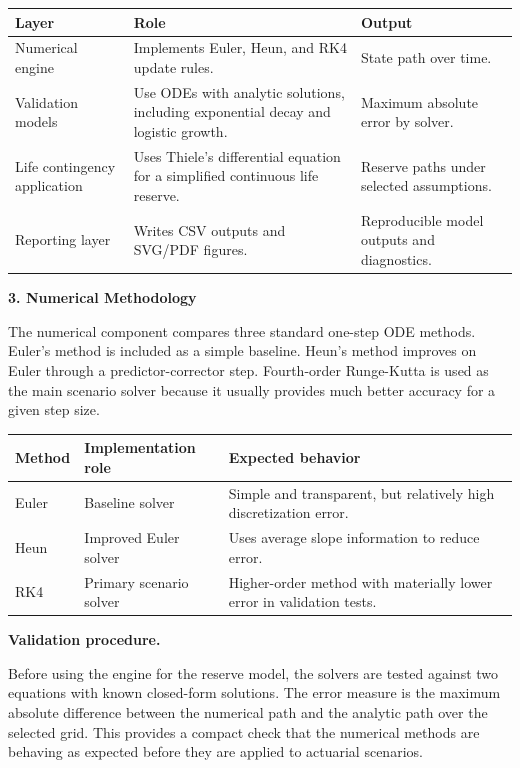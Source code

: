 \documentclass[11pt,letterpaper]{article}
\newcommand{\reportsection}[1]{%
  \vspace{5pt}
  \begin{center}
    {\large\bfseries #1}
  \end{center}
  \vspace{1pt}
}
\newcommand{\reportsubsection}[1]{%
  \vspace{5pt}
  {\normalsize\bfseries #1.}
}
\begin{document}
\begin{table}[H]
\centering
\small
{}
\begin{tabularx}{\textwidth}{p{1.25in} Y Y}
\toprule
\textbf{Layer} & \textbf{Role} & \textbf{Output} \\
\midrule
Numerical engine & Implements Euler, Heun, and RK4 update rules. & State path over time. \\
Validation models & Use ODEs with analytic solutions, including exponential decay and logistic growth. & Maximum absolute error by solver. \\
Life contingency application & Uses Thiele's differential equation for a simplified continuous life reserve. & Reserve paths under selected assumptions. \\
Reporting layer & Writes CSV outputs and SVG/PDF figures. & Reproducible model outputs and diagnostics. \\
\bottomrule
\end{tabularx}
\end{table}

\newpage
\reportsection{3. Numerical Methodology}

The numerical component compares three standard one-step ODE methods. Euler's method is included as a simple baseline. Heun's method improves on Euler through a predictor-corrector step. Fourth-order Runge-Kutta is used as the main scenario solver because it usually provides much better accuracy for a given step size.

\begin{table}[H]
\centering
\small
{}
\begin{tabularx}{\textwidth}{p{1.1in} p{1.85in} Y}
\toprule
\textbf{Method} & \textbf{Implementation role} & \textbf{Expected behavior} \\
\midrule
Euler & Baseline solver & Simple and transparent, but relatively high discretization error. \\
Heun & Improved Euler solver & Uses average slope information to reduce error. \\
RK4 & Primary scenario solver & Higher-order method with materially lower error in validation tests. \\
\bottomrule
\end{tabularx}
\end{table}

\reportsubsection{Validation procedure}
Before using the engine for the reserve model, the solvers are tested against two equations with known closed-form solutions. The error measure is the maximum absolute difference between the numerical path and the analytic path over the selected grid. This provides a compact check that the numerical methods are behaving as expected before they are applied to actuarial scenarios.
\end{document}
